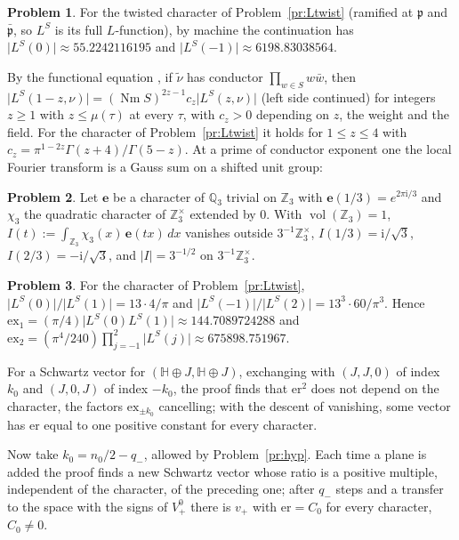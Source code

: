 \documentclass[reqno]{amsart}
\theoremstyle{definition}
\newtheorem{problem}{Problem}[section]
\theoremstyle{plain}
\newcommand{\Z}{\mathbb Z}
\newcommand{\Q}{\mathbb Q}
\newcommand{\Nm}{\operatorname{Nm}}
\newcommand{\ex}{\mathrm{ex}}
\newcommand{\vol}{\operatorname{vol}}
\newcommand{\ii}{\mathrm{i}}
\begin{document}
\begin{problem}\label{pr:continued}
For the twisted character of Problem~\ref{pr:Ltwist} (ramified at \(\mathfrak p\) and \(\bar{\mathfrak p}\), so \(L^S\) is its full \(L\)-function), by machine the continuation has \(\lvert L^S(0)\rvert \approx 55.2242116195\) and \(\lvert L^S(-1)\rvert \approx 6198.83038564\).
\end{problem}

By the functional equation \cite[Ch.~XV, \S4.4]{CF}, if \(\tilde\nu\) has conductor \(\prod_{w \in S}w\bar w\), then \(\lvert L^S(1-z,\nu)\rvert = (\Nm S)^{2z-1}c_z\lvert L^S(z,\nu)\rvert\) (left side continued) for integers \(z \ge 1\) with \(z \le \mu(\tau)\) at every \(\tau\), with \(c_z > 0\) depending on \(z\), the weight and the field.  For the character of Problem~\ref{pr:Ltwist} it holds for \(1 \le z \le 4\) with \(c_z = \pi^{1-2z}\Gamma(z+4)/\Gamma(5-z)\).  At a prime of conductor exponent one the local Fourier transform is a Gauss sum on a shifted unit group:

\begin{problem}\label{pr:gauss-local}
Let \(\mathbf e\) be a character of \(\Q_3\) trivial on \(\Z_3\) with \(\mathbf e(1/3) = e^{2\pi\ii/3}\) and \(\chi_3\) the quadratic character of \(\Z_3^\times\) extended by \(0\).  With \(\vol(\Z_3) = 1\), \(I(t) := \int_{\Z_3}\chi_3(x)\,\mathbf e(tx)\,dx\) vanishes outside \(3^{-1}\Z_3^\times\), \(I(1/3) = \ii/\sqrt 3\), \(I(2/3) = -\ii/\sqrt 3\), and \(\lvert I\rvert = 3^{-1/2}\) on \(3^{-1}\Z_3^\times\).
\end{problem}

\begin{problem}\label{pr:central}
For the character of Problem~\ref{pr:Ltwist}, \(\lvert L^S(0)\rvert/\lvert L^S(1)\rvert = 13 \cdot 4/\pi\) and \(\lvert L^S(-1)\rvert/\lvert L^S(2)\rvert = 13^3 \cdot 60/\pi^3\).  Hence \(\ex_1 = (\pi/4)\lvert L^S(0)L^S(1)\rvert \approx 144.7089724288\) and \(\ex_2 = (\pi^4/240)\prod_{j=-1}^{2}\lvert L^S(j)\rvert \approx 675898.751967\).
\end{problem}

For a Schwartz vector for \((\mathbb H \oplus J, \mathbb H \oplus J)\), exchanging with \((J, J, 0)\) of index \(k_0\) and \((J, 0, J)\) of index \(-k_0\), the proof finds that \(\mathrm{er}^2\) does not depend on the character, the factors \(\ex_{\pm k_0}\) cancelling; with the descent of vanishing, some vector has \(\mathrm{er}\) equal to one positive constant for every character.

Now take \(k_0 = n_0/2 - q_-\), allowed by Problem~\ref{pr:hyp}.  Each time a plane is added the proof finds a new Schwartz vector whose ratio is a positive multiple, independent of the character, of the preceding one; after \(q_-\) steps and a transfer to the space with the signs of \(V^0_+\) there is \(v_+\) with \(\mathrm{er} = C_0\) for every character, \(C_0 \ne 0\).
\end{document}
